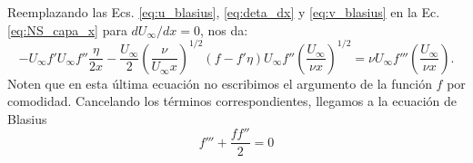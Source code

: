 Reemplazando las Ecs. \eqref{eq:u_blasius}, \eqref{eq:deta_dx} y \eqref{eq:v_blasius} en la Ec. \eqref{eq:NS_capa_x} para $dU_\infty/dx = 0$, nos da:
%
\begin{equation}
-U_\infty f'U_\infty f''\frac{\eta}{2x} - \frac{U_\infty}{2}\left(\frac{\nu}{U_\infty x}\right)^{1/2}(f-f'\eta)U_\infty f''\left(\frac{U_\infty}{\nu x}\right)^{1/2} = \nu U_\infty f'''\left(\frac{U_\infty}{\nu x}\right).
\end{equation}
%
Noten que en esta última ecuación no escribimos el argumento de la función $f$ por comodidad.
Cancelando los términos correspondientes, llegamos a la ecuación de Blasius
%
\begin{equation}
f'''+\frac{ff''}{2}=0
\end{equation}
